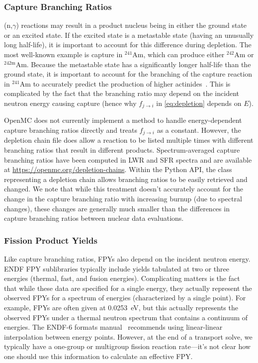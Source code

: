 \documentclass[3p,authoryear]{elsarticle}
\begin{document}
\subsubsection{Capture Branching Ratios}

(n,$\gamma$) reactions may result in a product nucleus being in either the
ground state or an excited state. If the excited state is a metastable state
(having an unusually long half-life), it is important to account for this
difference during depletion. The most well-known example is capture in
$^{241}$Am, which can produce either $^{242}$Am or $^{242\text{m}}$Am. Because
the metastable state has a significantly longer half-life than the ground state,
it is important to account for the branching of the capture reaction in
$^{241}$Am to accurately predict the production of higher
actinides~\citep{haeck2012nse}. This is complicated by the fact that the
branching ratio may depend on the incident neutron energy causing capture (hence
why $f_{j\rightarrow i}$ in \cref{eq:depletion} depends on $E$).

OpenMC does not currently implement a method to handle energy-dependent capture
branching ratios directly and treats $f_{j\rightarrow i}$ as a constant.
However, the depletion chain file does allow a reaction to be listed multiple
times with different branching ratios that result in different products.
Spectrum-averaged capture branching ratios have been computed in LWR and SFR
spectra and are available at \url{https://openmc.org/depletion-chains}. Within
the Python API, the class representing a depletion chain allows branching ratios
to be easily retrieved and changed. We note that while this treatment doesn't
accurately account for the change in the capture branching ratio with increasing
burnup (due to spectral changes), these changes are generally much smaller than
the differences in capture branching ratios between nuclear data evaluations.

\subsubsection{Fission Product Yields}
\label{sec:fpy}

Like capture branching ratios, FPYs also depend on the incident neutron energy.
ENDF FPY sublibraries typically include yields tabulated at two or three
energies (thermal, fast, and fusion energies). Complicating matters is the fact
that while these data are specified for a single energy, they actually represent
the observed FPYs for a spectrum of energies (characterized by a single point).
For example, FPYs are often given at \SI{0.0253}{\electronvolt}, but this
actually represents the observed FPYs under a thermal neutron spectrum that
contains a continuum of energies. The ENDF-6 formats manual~\citep{trkov2018bnl}
recommends using linear-linear interpolation between energy points. However, at
the end of a transport solve, we typically have a one-group or multigroup
fission reaction rate---it's not clear how one should use this information to
calculate an effective FPY.
\end{document}

